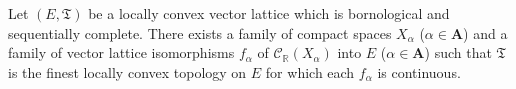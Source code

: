 Let $(E, \mathfrak{T})$ be a locally convex vector lattice which is bornological and sequentially complete. There exists a family of compact spaces $X_\alpha$ ($\alpha \in \mathbf{A}$) and a family of vector lattice isomorphisms $f_\alpha$ of $\mathcal{C}_{\mathbb{R}}(X_\alpha)$ into $E$ ($\alpha \in \mathbf{A}$) such that $\mathfrak{T}$ is the finest locally convex topology on $E$ for which each $f_\alpha$ is continuous.
